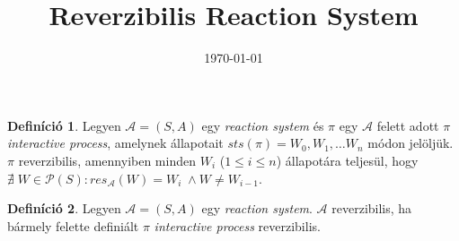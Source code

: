 \documentclass[12pt]{article}
\title{Reverzibilis Reaction System}
\date{\today}
\theoremstyle{definition}
\newtheorem*{definition*}{Definíció}
\theoremstyle{plain}
\begin{document}
    \maketitle

    \begin{definition*}
        Legyen $\mathcal{A} = (S, A)$ egy \textit{reaction system} és $\pi$ egy $\mathcal{A}$ felett adott $\pi$ \textit{interactive process}, amelynek állapotait $\textit{sts}(\pi)=W_{0},W_{1},\ldots W_{n}$ módon jelöljük. $\pi$ reverzibilis, amennyiben minden $W_{i}$ ($1 \leq i \leq n$) állapotára teljesül, hogy $\nexists \; W \in \mathcal{P}(S) : res_{\mathcal{A}}(W) = W_{i} \; \wedge W \neq W_{i - 1}$.
    \end{definition*}

    \begin{definition*}
        Legyen $\mathcal{A} = (S, A)$ egy \textit{reaction system}. $\mathcal{A}$ reverzibilis, ha bármely felette definiált $\pi$ \textit{interactive process} reverzibilis.
    \end{definition*}
\end{document}

